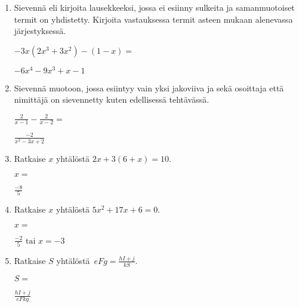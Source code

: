 \documentclass[finnish, a4paper, 12pt]{article}
\begin{document}
\begin{enumerate}[leftmargin=*]
		\vspace{8pt}
		
		\item %
		Sievennä eli kirjoita lausekkeeksi, jossa ei esiinny sulkeita ja 
		samanmuotoiset termit on yhdistetty. 
		Kirjoita vastauksessa termit asteen mukaan alenevassa järjestyksessä. 
		
		\(
		\displaystyle
		-3x(2x^3 + 3x^2) - (1 - x) = 
		\) %
		\begin{version:withAnswers}
		\( -6x^4 -9x^3 + x -1 \)
		\end{version:withAnswers}
		
		\vspace{8pt}
		
		\item %
		Sievennä %
		muotoon, jossa esiintyy vain yksi jakoviiva ja sekä osoittaja
		että nimittäjä on sievennetty kuten edellisessä tehtävässä.
		
		\(
		\displaystyle
		\frac{2}{x-1}- \frac{2}{x - 2} =
		\) %
		\begin{version:withAnswers}
		\( \frac{-2}{x^2-3x+2} \)
		\end{version:withAnswers}
		
		\vspace{8pt}
		
		\item %
		Ratkaise \(x\) yhtälöstä \(2x + 3(6 + x) = 10\).
		
		\(
		x = 
		\)	%
		\begin{version:withAnswers}
		 \( \frac{-8}{5} \)
		\end{version:withAnswers}
		\vspace{8pt}
		
		\item %
		Ratkaise \(x\) yhtälöstä \(5x^2+17x+6= 0\).
		
		\(
		x = 		
		\)	%
		
		\begin{version:withAnswers}
		\(\frac{-2}{5} \text{  tai } x = -3\)
		\end{version:withAnswers}
		\vspace{8pt}
		
		\item %
		Ratkaise \(S\) yhtälöstä 
		\(
		\displaystyle \,
		eFg = \frac{hI+j}{kS} .
		\)	
		
		\(
		S = 
		\) %
		\begin{version:withAnswers}
		\( \frac{hI+j}{eFkg}\)
		\end{version:withAnswers}
		
	\end{enumerate}
	
	
\end{document}
